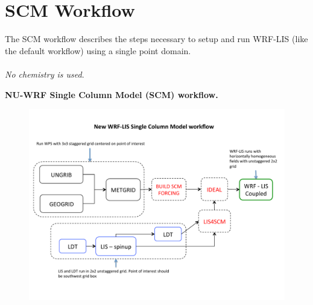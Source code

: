 \section{SCM Workflow}

\begin{frame}

The SCM workflow describes the steps necessary to setup and run WRF-LIS (like the default workflow) using a single point domain.\\
\mbox{}\\
\emph{No chemistry is used}.
\mbox{}\\

\end{frame}

\begin{frame}

\centering
\textbf{NU-WRF Single Column Model (SCM) workflow.}
\begin{figure}[t]
\centering
\includegraphics[scale=.4]{scm-workflow.pdf}
\end{figure}

\end{frame}

